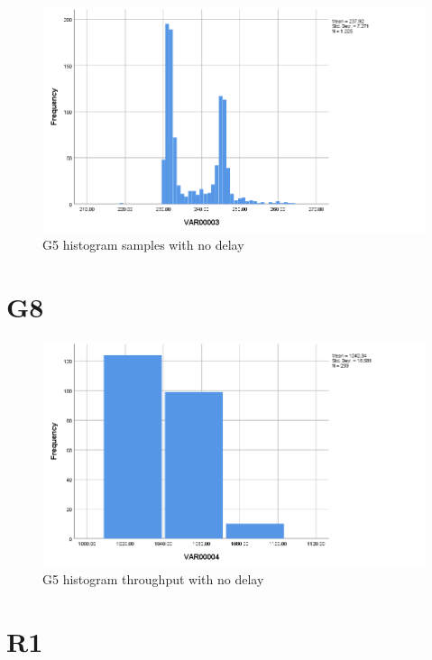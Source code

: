 \documentclass[hidelinks, 12pt, a4paper]{article}
\begin{document}
\begin{figure}[h!]
	\centering
		\includegraphics[height=.38\textheight, width=\textwidth]{assets/session1/g7.png}
		\caption{G5 histogram samples with no delay} 
	\end{figure}

\section{G8}

\begin{figure}[h!]
	\centering
		\includegraphics[height=.38\textheight, width=\textwidth]{assets/session1/g8.png}
		\caption{G5 histogram throughput with no delay} 
	\end{figure}

\section{R1}
\end{document}
